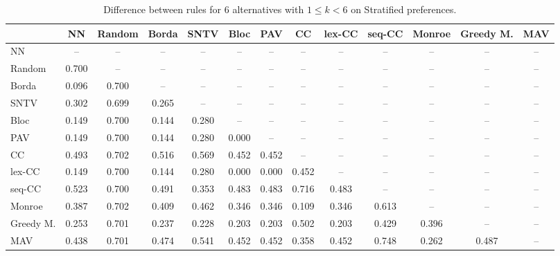 
\begin{table*}[htbp]
\centering
\begin{tabular}{lcccccccccccc}
\toprule
 & NN & Random & Borda & SNTV & Bloc & PAV & CC & lex-CC & seq-CC & Monroe & Greedy M. & MAV \\
\midrule
NN & -- & -- & -- & -- & -- & -- & -- & -- & -- & -- & -- & -- \\
Random & \cellcolor{blue!70} 0.700 & -- & -- & -- & -- & -- & -- & -- & -- & -- & -- & -- \\
Borda & \cellcolor{blue!9} 0.096 & \cellcolor{blue!70} 0.700 & -- & -- & -- & -- & -- & -- & -- & -- & -- & -- \\
SNTV & \cellcolor{blue!30} 0.302 & \cellcolor{blue!69} 0.699 & \cellcolor{blue!26} 0.265 & -- & -- & -- & -- & -- & -- & -- & -- & -- \\
Bloc & \cellcolor{blue!14} 0.149 & \cellcolor{blue!70} 0.700 & \cellcolor{blue!14} 0.144 & \cellcolor{blue!28} 0.280 & -- & -- & -- & -- & -- & -- & -- & -- \\
PAV & \cellcolor{blue!14} 0.149 & \cellcolor{blue!70} 0.700 & \cellcolor{blue!14} 0.144 & \cellcolor{blue!28} 0.280 & \cellcolor{blue!0} 0.000 & -- & -- & -- & -- & -- & -- & -- \\
CC & \cellcolor{blue!49} 0.493 & \cellcolor{blue!70} 0.702 & \cellcolor{blue!51} 0.516 & \cellcolor{blue!56} 0.569 & \cellcolor{blue!45} 0.452 & \cellcolor{blue!45} 0.452 & -- & -- & -- & -- & -- & -- \\
lex-CC & \cellcolor{blue!14} 0.149 & \cellcolor{blue!70} 0.700 & \cellcolor{blue!14} 0.144 & \cellcolor{blue!28} 0.280 & \cellcolor{blue!0} 0.000 & \cellcolor{blue!0} 0.000 & \cellcolor{blue!45} 0.452 & -- & -- & -- & -- & -- \\
seq-CC & \cellcolor{blue!52} 0.523 & \cellcolor{blue!70} 0.700 & \cellcolor{blue!49} 0.491 & \cellcolor{blue!35} 0.353 & \cellcolor{blue!48} 0.483 & \cellcolor{blue!48} 0.483 & \cellcolor{blue!71} 0.716 & \cellcolor{blue!48} 0.483 & -- & -- & -- & -- \\
Monroe & \cellcolor{blue!38} 0.387 & \cellcolor{blue!70} 0.702 & \cellcolor{blue!40} 0.409 & \cellcolor{blue!46} 0.462 & \cellcolor{blue!34} 0.346 & \cellcolor{blue!34} 0.346 & \cellcolor{blue!10} 0.109 & \cellcolor{blue!34} 0.346 & \cellcolor{blue!61} 0.613 & -- & -- & -- \\
Greedy M. & \cellcolor{blue!25} 0.253 & \cellcolor{blue!70} 0.701 & \cellcolor{blue!23} 0.237 & \cellcolor{blue!22} 0.228 & \cellcolor{blue!20} 0.203 & \cellcolor{blue!20} 0.203 & \cellcolor{blue!50} 0.502 & \cellcolor{blue!20} 0.203 & \cellcolor{blue!42} 0.429 & \cellcolor{blue!39} 0.396 & -- & -- \\
MAV & \cellcolor{blue!43} 0.438 & \cellcolor{blue!70} 0.701 & \cellcolor{blue!47} 0.474 & \cellcolor{blue!54} 0.541 & \cellcolor{blue!45} 0.452 & \cellcolor{blue!45} 0.452 & \cellcolor{blue!35} 0.358 & \cellcolor{blue!45} 0.452 & \cellcolor{blue!74} 0.748 & \cellcolor{blue!26} 0.262 & \cellcolor{blue!48} 0.487 & -- \\
\bottomrule
\end{tabular}

\caption{Difference between rules for 6 alternatives with $1 \leq k < 6$ on Stratified preferences.}
\label{tab:rule_distance_heatmap-m=[6]-pref_dist=stratification__args__weight=0.5}
\end{table*}
    